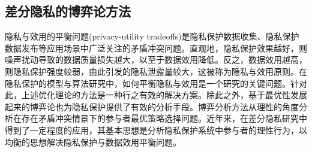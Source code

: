 %
%


\subsection{差分隐私的博弈论方法}

隐私与效用的平衡问题(privacy-utility tradeoffs)是隐私保护数据收集、隐私保护数据发布等应用场景中广泛关注的矛盾冲突问题。直观地，隐私保护效果越好，则噪声扰动导致的数据质量损失越大，以至于数据效用降低。反之，数据效用越高，则隐私保护强度较弱，由此引发的隐私泄露量较大，这被称为隐私与效用原则\cite{sankar2013utility}。在隐私保护的模型与算法研究中，如何平衡隐私与效用是一个研究的关键问题。针对此，上述优化理论的方法是一种行之有效的解决方案。除此之外，基于最优性发展起来的博弈论\cite{Neumann1944The}也为隐私保护提供了有效的分析手段。博弈分析方法从理性的角度分析在存在矛盾冲突情景下的参与者最优策略选择问题。近年来，在差分隐私研究中得到了一定程度的应用，其基本思想是分析隐私保护系统中参与者的理性行为，以均衡的思想解决隐私保护与数据效用平衡问题。

